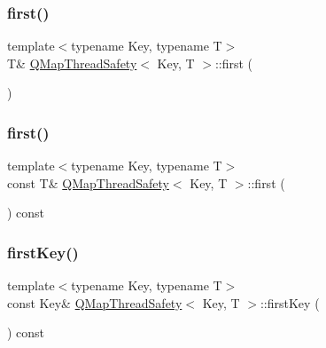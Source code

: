 \subsubsection{\texorpdfstring{first()}{first()}\hspace{0.1cm}{\footnotesize\ttfamily [1/2]}}
{\footnotesize\ttfamily template$<$typename Key, typename T$>$ \\
T\& \hyperlink{class_q_map_thread_safety}{Q\+Map\+Thread\+Safety}$<$ Key, T $>$\+::first (\begin{DoxyParamCaption}{ }\end{DoxyParamCaption})\hspace{0.3cm}{\ttfamily [inline]}}

\mbox{\label{class_q_map_thread_safety_ac2f2f58bb6a3dbd370134a96d3310222}} 
\subsubsection{\texorpdfstring{first()}{first()}\hspace{0.1cm}{\footnotesize\ttfamily [2/2]}}
{\footnotesize\ttfamily template$<$typename Key, typename T$>$ \\
const T\& \hyperlink{class_q_map_thread_safety}{Q\+Map\+Thread\+Safety}$<$ Key, T $>$\+::first (\begin{DoxyParamCaption}{ }\end{DoxyParamCaption}) const\hspace{0.3cm}{\ttfamily [inline]}}

\mbox{\label{class_q_map_thread_safety_ae1f69d7b72decd18f00f97d70e3daf88}} 
\subsubsection{\texorpdfstring{first\+Key()}{firstKey()}}
{\footnotesize\ttfamily template$<$typename Key, typename T$>$ \\
const Key\& \hyperlink{class_q_map_thread_safety}{Q\+Map\+Thread\+Safety}$<$ Key, T $>$\+::first\+Key (\begin{DoxyParamCaption}{ }\end{DoxyParamCaption}) const\hspace{0.3cm}{\ttfamily [inline]}}

